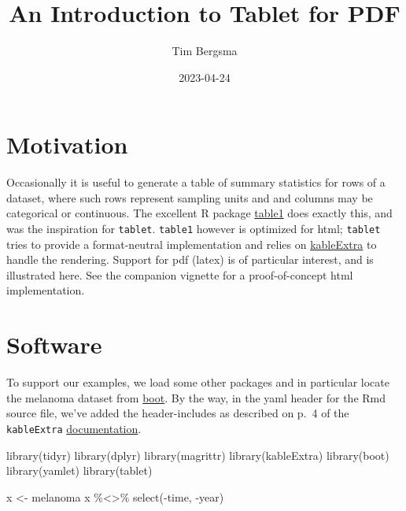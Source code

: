 \documentclass[
]{article}
\title{An Introduction to Tablet for PDF}
\author{Tim Bergsma}
\date{2023-04-24}
\newenvironment{Shaded}{\begin{snugshade}}{\end{snugshade}}
\newcommand{\FunctionTok}[1]{\textcolor[rgb]{0.00,0.00,0.00}{#1}}
\newcommand{\NormalTok}[1]{#1}
\newcommand{\OtherTok}[1]{\textcolor[rgb]{0.56,0.35,0.01}{#1}}
\newcommand{\SpecialCharTok}[1]{\textcolor[rgb]{0.00,0.00,0.00}{#1}}
\begin{document}
\maketitle

{
\hypersetup{linkcolor=}
\setcounter{tocdepth}{2}
\tableofcontents
}
\hypertarget{motivation}{%
\section{Motivation}\label{motivation}}

Occasionally it is useful to generate a table of summary statistics for
rows of a dataset, where such rows represent sampling units and and
columns may be categorical or continuous. The excellent R package
\href{https://CRAN.R-project.org/package=table1}{table1} does exactly
this, and was the inspiration for \texttt{tablet}. \texttt{table1}
however is optimized for html; \texttt{tablet} tries to provide a
format-neutral implementation and relies on
\href{https://CRAN.R-project.org/package=kableExtra}{kableExtra} to
handle the rendering. Support for pdf (latex) is of particular interest,
and is illustrated here. See the companion vignette for a
proof-of-concept html implementation.

\hypertarget{software}{%
\section{Software}\label{software}}

To support our examples, we load some other packages and in particular
locate the melanoma dataset from
\href{https://CRAN.R-project.org/package=boot}{boot}. By the way, in the
yaml header for the Rmd source file, we've added the header-includes as
described on p.~4 of the \texttt{kableExtra}
\href{https://haozhu233.github.io/kableExtra/awesome_table_in_pdf.pdf}{documentation}.

\begin{Shaded}
\begin{Highlighting}[]
\FunctionTok{library}\NormalTok{(tidyr)}
\FunctionTok{library}\NormalTok{(dplyr)}
\FunctionTok{library}\NormalTok{(magrittr)}
\FunctionTok{library}\NormalTok{(kableExtra)}
\FunctionTok{library}\NormalTok{(boot)}
\FunctionTok{library}\NormalTok{(yamlet)}
\FunctionTok{library}\NormalTok{(tablet)}
\end{Highlighting}
\end{Shaded}

\begin{Shaded}
\begin{Highlighting}[]
\NormalTok{x }\OtherTok{\textless{}{-}}\NormalTok{ melanoma}
\NormalTok{x }\SpecialCharTok{\%\textless{}\textgreater{}\%} \FunctionTok{select}\NormalTok{(}\SpecialCharTok{{-}}\NormalTok{time, }\SpecialCharTok{{-}}\NormalTok{year)}
\end{Highlighting}
\end{Shaded}
\end{document}
